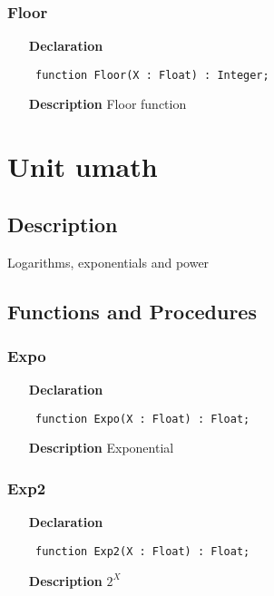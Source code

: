 \documentclass[12pt,a4paper,oneside]{report}
\newcommand{\declarationitem}[1]{\textbf{#1}}
\newcommand{\descriptiontitle}[1]{\textbf{#1}}
\newcommand{\code}[1]{\texttt{#1}}
\begin{document}
\subsubsection{Floor}
\label{uround-Floor}
\begin{itemize}\item[\declarationitem{Declaration}\hfill]
	\begin{flushleft}
		\code{
			function Floor(X : Float) : Integer;}
		
	\end{flushleft}
	
	\par
	\item[\descriptiontitle{Description}]
	Floor function
	
\end{itemize}
\section{Unit umath}
\label{umath}
\subsection{Description}
Logarithms, exponentials and power 
\subsection{Functions and Procedures}
\subsubsection{Expo}
\label{umath-Expo}
\begin{itemize}\item[\declarationitem{Declaration}\hfill]
	\begin{flushleft}
		\code{
			function Expo(X : Float) : Float;}
		
	\end{flushleft}
	
	\par
	\item[\descriptiontitle{Description}]
	Exponential
	
\end{itemize}
\subsubsection{Exp2}
\label{umath-Exp2}
\begin{itemize}\item[\declarationitem{Declaration}\hfill]
	\begin{flushleft}
		\code{
			function Exp2(X : Float) : Float;}
		
	\end{flushleft}
	
	\par
	\item[\descriptiontitle{Description}]
	$2^X$
	
\end{itemize}
\end{document}
